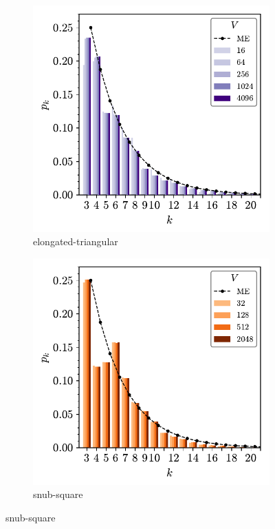 \begin{figure}[btp]
     	
     \vspace{2mm}
     \begin{subfigure}[b]{0.40\textwidth}
         \centering
         \includegraphics[width=\textwidth]{./figures/procrystals/elong3_pk.pdf}
         \caption{elongated\--triangular}
         \label{fig:pro3pkc}
     \end{subfigure}
          \hspace{1cm}
     \begin{subfigure}[b]{0.40\textwidth}
         \centering
         \includegraphics[width=\textwidth]{./figures/procrystals/snub3_pk.pdf}
         \caption{snub\--square}
         \label{fig:pro3pkd}
     \end{subfigure}
     

\end{figure}
